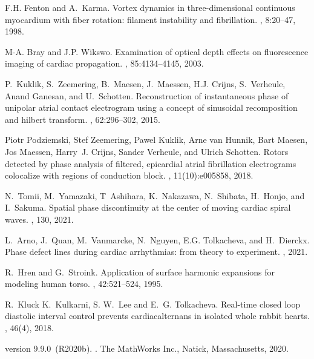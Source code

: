 \documentclass{article}
\begin{document}
\begin{thebibliography}{10}
F.H. Fenton and A.~Karma.
\newblock Vortex dynamics in three-dimensional continuous myocardium with fiber
  rotation: filament instability and fibrillation.
, 8:20--47, 1998.

M-A. Bray and J.P. Wikswo.
\newblock Examination of optical depth effects on fluorescence imaging of
  cardiac propagation.
, 85:4134--4145, 2003.

P.~Kuklik, S.~Zeemering, B.~Maesen, J.~Maessen, H.J. Crijns, S.~Verheule, Anand
  Ganesan, and U.~Schotten.
\newblock Reconstruction of instantaneous phase of unipolar atrial contact
  electrogram using a concept of sinusoidal recomposition and hilbert
  transform.
, 62:296--302, 2015.

Piotr Podziemski, Stef Zeemering, Pawel Kuklik, Arne van Hunnik, Bart Maesen,
  Jos Maessen, Harry~J. Crijns, Sander Verheule, and Ulrich Schotten.
\newblock Rotors detected by phase analysis of filtered, epicardial atrial
  fibrillation electrograms colocalize with regions of conduction block.
, 11(10):e005858,
  2018.

N.~Tomii, M.~Yamazaki, T~Ashihara, K.~Nakazawa, N.~Shibata, H.~Honjo, and
  I.~Sakuma.
\newblock Spatial phase discontinuity at the center of moving cardiac spiral
  waves.
, 130, 2021.

L.~Arno, J.~Quan, M.~Vanmarcke, N.~Nguyen, E.G. Tolkacheva, and H.~Dierckx.
\newblock Phase defect lines during cardiac arrhythmias: from theory to
  experiment.
, 2021.

R.~Hren and G.~Stroink.
\newblock Application of surface harmonic expansions for modeling human torso.
, 42:521--524, 1995.

R.~Kluck K.~Kulkarni, S. W.~Lee and E.~G. Tolkacheva.
\newblock Real-time closed loop diastolic interval control prevents
  cardiacalternans in isolated whole rabbit hearts.
, 46(4), 2018.

version 9.9.0~(R2020b).
.
\newblock The MathWorks Inc., Natick, Massachusetts, 2020.


\end{thebibliography}
\end{document}
